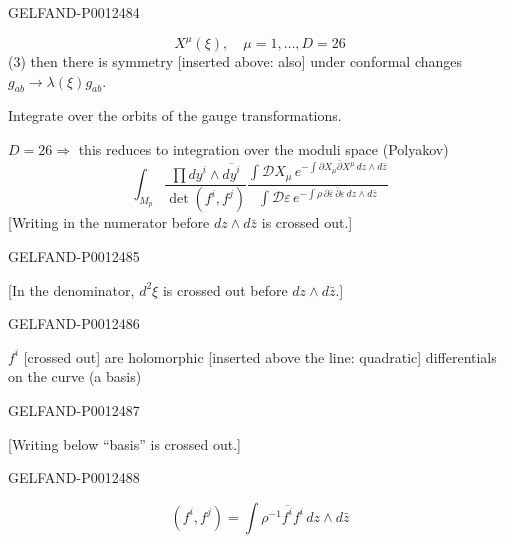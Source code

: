 \begin{GelfandAdjacentEvidence}{GELFAND-P001248}{4}

\begin{equation*}
X^\mu(\xi),\quad\mu=1,\ldots,D=26
\end{equation*}
(3) then there is symmetry [inserted above: also] under conformal changes $g_{ab}\to\lambda(\xi)g_{ab}$.

Integrate over the orbits of the gauge transformations.

\underline{$D=26$}\quad $\Rightarrow$ this reduces to integration over the moduli space (Polyakov)
\begin{equation*}
\int_{M_p}
\frac{\prod dy^i\wedge\overline{dy^i}}{\det(f^i,f^j)}
\frac{\displaystyle\int\mathcal DX_\mu\,
 e^{-\int\partial X_\mu\bar\partial X^\mu\,dz\wedge d\bar z}}
{\displaystyle\int\mathcal D\varepsilon\,
 e^{-\int\rho\,\partial\bar\varepsilon\,\bar\partial\varepsilon\,dz\wedge d\bar z}}
\tag{4}
\end{equation*}
[Writing in the numerator before $dz\wedge d\bar z$ is crossed out.]
\end{GelfandAdjacentEvidence}
\begin{GelfandAdjacentEvidence}{GELFAND-P001248}{5}

[In the denominator, $d^2\xi$ is crossed out before $dz\wedge d\bar z$.]
\end{GelfandAdjacentEvidence}
\begin{GelfandAdjacentEvidence}{GELFAND-P001248}{6}


$f^i$ [crossed out] are holomorphic [inserted above the line: quadratic] differentials on the curve (a basis)
\end{GelfandAdjacentEvidence}
\begin{GelfandAdjacentEvidence}{GELFAND-P001248}{7}

[Writing below “basis” is crossed out.]
\end{GelfandAdjacentEvidence}
\begin{GelfandAdjacentEvidence}{GELFAND-P001248}{8}

\begin{equation*}
(f^i,f^j)=\int\rho^{-1}\overline{f^i}f^i\,dz\wedge d\bar z\tag{5}
\end{equation*}
\end{GelfandAdjacentEvidence}
